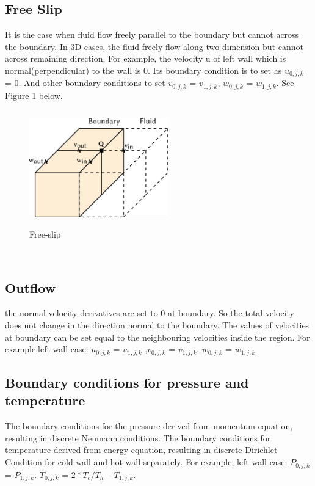 \documentclass{article}%
\begin{document}
\subsection{Free Slip} 
It is the case when fluid flow freely parallel to the boundary but cannot across the boundary. In 3D cases, the fluid freely flow along two dimension but cannot across remaining direction. For example, the velocity u of left wall which is normal(perpendicular) to the wall is 0. Its boundary condition is to set as $u_{0,j,k}$ = 0. And other boundary conditions to set $v_{0,j,k}$ = $v_{1,j,k}$, $w_{0,j,k}$ = $w_{1,j,k}$. See Figure 1 below.
\\
\begin{figure}[h]
    \centering
    \includegraphics[width=6cm, height=5cm]{freeslip}
    \caption{Free-slip}
    \label{fig:mesh1}
\end{figure}
\\
\subsection{Outflow}
the normal velocity derivatives are set to 0 at boundary. So the total velocity does not change in the direction normal to the boundary. The values of velocities at boundary can be set equal to the neighbouring velocities inside the region. For example,left wall case: $u_{0,j,k}$ = $u_{1,j,k}$ ,$v_{0,j,k}$ = $v_{1,j,k}$, $w_{0,j,k}$ = $w_{1,j,k}$
\subsection{Boundary conditions for pressure and temperature}
The boundary conditions for the pressure derived from momentum equation, resulting in discrete Neumann conditions. The boundary conditions for temperature derived from energy equation, resulting in discrete Dirichlet Condition for cold wall and hot wall separately. For example, left wall case: $P_{0,j,k}$ = $P_{1,j,k}$.  $T_{0,j,k}$ = $2*T_c/T_h$ – $T_{1,j,k}$.
\end{document}
